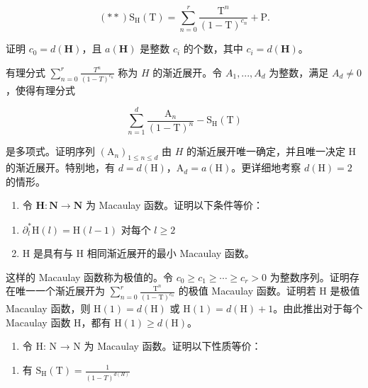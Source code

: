 \[
(* *) \mathrm{S} _ {\mathrm{H}} (\mathrm{T}) = \sum_ {n = 0} ^ {r} \frac {\mathrm{T} ^ {n}}{(1 - \mathrm{T}) ^ {c _ {n}}} + \mathrm{P}.
\]

证明 \(c_0 = d(\mathbf{H})\)，且 \(a(\mathbf{H})\) 是整数 \(c_i\) 的个数，其中 \(c_i = d(\mathbf{H})\)。

有理分式 \(\sum_{n=0}^{r}\frac{T^n}{(1-T)^{c_n}}\) 称为 \(H\) 的渐近展开。令 \(A_1, ..., A_d\) 为整数，满足 \(A_d \neq 0\)，使得有理分式

\[
\sum_ {n = 1} ^ {d} \frac {\mathrm{A} _ {n}}{(1 - \mathrm{T}) ^ {n}} - \mathrm{S} _ {\mathrm{H}} (\mathrm{T})
\]

是多项式。证明序列 \((\mathrm{A}_{n})_{1\leq n\leq d}\) 由 \(H\) 的渐近展开唯一确定，并且唯一决定 H 的渐近展开。特别地，有 \(d=d(\mathrm{H})\)，\(\mathrm{A}_{d}=a(\mathrm{H})\)。更详细地考察 \(d(\mathrm{H})=2\) 的情形。

\begin{enumerate}
\def\labelenumi{\alph{enumi})}
\setcounter{enumi}{3}
\tightlist
\item
  令 \(\mathbf{H}:\mathbf{N}\to\mathbf{N}\) 为 Macaulay 函数。证明以下条件等价：
\end{enumerate}

\begin{enumerate}
\def\labelenumi{(\roman{enumi})}
\item
  \(\partial_l^*\mathrm{H}(l) = \mathrm{H}(l - 1)\) 对每个 \(l\geqslant 2\)
\item
  H 是具有与 H 相同渐近展开的最小 Macaulay 函数。
\end{enumerate}

这样的 Macaulay 函数称为极值的。令 \(c_{0} \geqslant c_{1} \geqslant \cdots \geqslant c_{r} > 0\) 为整数序列。证明存在唯一一个渐近展开为 \(\sum_{n=0}^{r} \frac{\mathrm{T}^{n}}{(1 - \mathrm{T})^{c_{n}}}\) 的极值 Macaulay 函数。证明若 H 是极值 Macaulay 函数，则 \(\mathrm{H}(1) = d(\mathrm{H})\) 或 \(\mathrm{H}(1) = d(\mathrm{H}) + 1\)。由此推出对于每个 Macaulay 函数 H，都有 \(\mathrm{H}(1) \geqslant d(\mathrm{H})\)。

\begin{enumerate}
\def\labelenumi{\alph{enumi})}
\setcounter{enumi}{4}
\tightlist
\item
  令 H: N → N 为 Macaulay 函数。证明以下性质等价：
\end{enumerate}

\begin{enumerate}
\def\labelenumi{(\roman{enumi})}
\tightlist
\item
  有 \(\mathrm{S_H(T)} = \frac{1}{(1 - T)^{d(H)}}\)
\end{enumerate}

